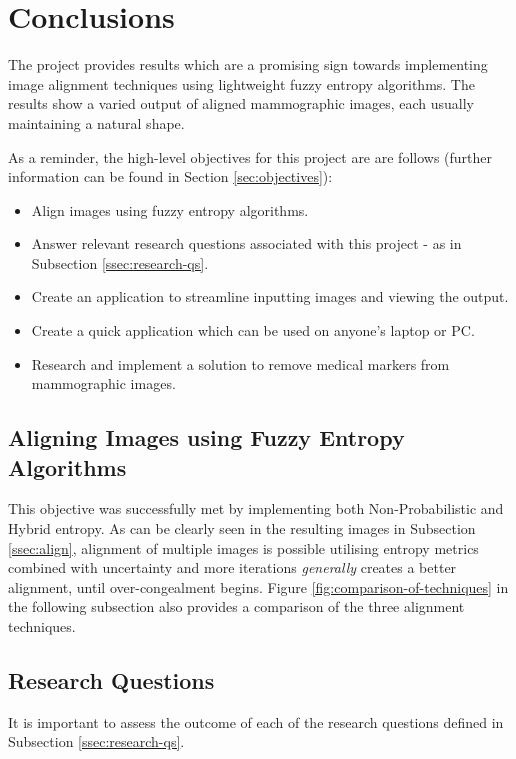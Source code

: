 \section{Conclusions}

The project provides results which are a promising sign towards implementing image alignment techniques using lightweight fuzzy entropy algorithms. The results show a varied output of aligned \gls{mammographic images}, each usually maintaining a natural shape.

As a reminder, the high-level objectives for this project are are follows (further information can be found in Section \ref{sec:objectives}):

\begin{itemize}
  \item Align images using fuzzy entropy algorithms.
  \item Answer relevant research questions associated with this project - as in Subsection \ref{ssec:research-qs}.
  \item Create an application to streamline inputting images and viewing the output.
  \item Create a quick application which can be used on anyone's laptop or PC.
  \item Research and implement a solution to remove medical markers from mammographic images.
\end{itemize}

\subsection{Aligning Images using Fuzzy Entropy Algorithms}

This objective was successfully met by implementing both Non-Probabilistic and Hybrid entropy. As can be clearly seen in the resulting images in Subsection \ref{ssec:align}, alignment of multiple images is possible utilising entropy metrics combined with uncertainty and more iterations \textit{generally} creates a better alignment, until over-congealment begins. Figure \ref{fig:comparison-of-techniques} in the following subsection also provides a comparison of the three alignment techniques.

\subsection{Research Questions}

It is important to assess the outcome of each of the research questions defined in Subsection \ref{ssec:research-qs}.

